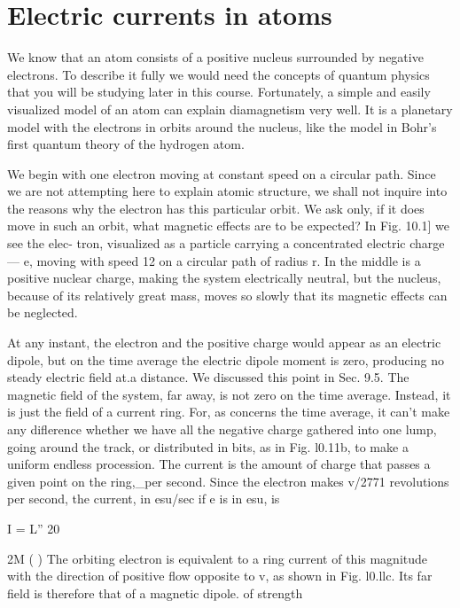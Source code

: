 {{%
 

 

  

 

 

\section{Electric currents in atoms}

We know that an atom consists of a positive nucleus surrounded
by negative electrons. To describe it fully we would need the concepts
of quantum physics that you will be studying later in this
course. Fortunately, a simple and easily visualized model of an
atom can explain diamagnetism very well. It is a planetary model
with the electrons in orbits around the nucleus, like the model in
Bohr's first quantum theory of the hydrogen atom.

We begin with one electron moving at constant speed on a circular
path. Since we are not attempting here to explain atomic structure,
we shall not inquire into the reasons why the electron has this particular
orbit. We ask only, if it does move in such an orbit, what
magnetic effects are to be expected? In Fig. 10.1] we see the elec-
tron, visualized as a particle carrying a concentrated electric charge
 ---  e, moving with speed 12 on a circular path of radius r. In the middle
is a positive nuclear charge, making the system electrically neutral,
but the nucleus, because of its relatively great mass, moves so slowly
that its magnetic effects can be neglected.

At any instant, the electron and the positive charge would appear
as an electric dipole, but on the time average the electric dipole
moment is zero, producing no steady electric field at.a distance. We
discussed this point in Sec. 9.5. The magnetic field of the system,
far away, is not zero on the time average. Instead, it is just the field
of a current ring. For, as concerns the time average, it can't make
any diflerence whether we have all the negative charge gathered into
one lump, going around the track, or distributed in bits, as in
Fig. l0.11b, to make a uniform endless procession. The current is
the amount of charge that passes a given point on the ring,_per
second. Since the electron makes v/2771 revolutions per second, the
current, in esu/sec if e is in esu, is

I = L'' 20

2M ( )
The orbiting electron is equivalent to a ring current of this magnitude
with the direction of positive flow opposite to v, as shown in
Fig. l0.llc. Its far field is therefore that of a magnetic dipole. of
strength

}}
